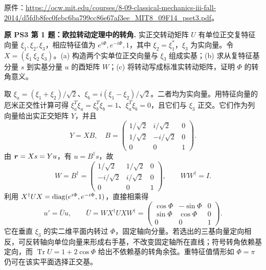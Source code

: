 原件：\url{https://ocw.mit.edu/courses/8-09-classical-mechanics-iii-fall-2014/d5fdb8fec0febc6ba799cc86e67af3ee_MIT8_09F14_pset3.pdf}。

\begin{example}
\textbf{原 PS3 第 1 题：欧拉转动定理中的转角.} 
实正交转动矩阵 $U$ 有单位正交复特征向量 $\xi_1,\xi_2,\xi_3$，相应特征值为 $e^{i\Phi},e^{-i\Phi},1$，其中 $\xi_2=\xi_1^*$，$\xi_3$ 为实向量。令 $X=(\xi_1\ \xi_2\ \xi_3)$。(a) 构造两个实单位正交向量与 $\xi_3$ 组成实基；(b) 求从复特征基分量 $s$ 到实基分量 $u$ 的酉矩阵 $W$；(c) 将转动写成标准实转动矩阵，证明 $\Phi$ 的转角意义。
\end{example}
\begin{solution}
取 $\xi_a=(\xi_1+\xi_2)/\sqrt2$、$\xi_b=i(\xi_1-\xi_2)/\sqrt2$。二者均为实向量。用特征向量的厄米正交性计算可得 $\xi_a^T\xi_a=\xi_b^T\xi_b=1$、$\xi_a^T\xi_b=0$，且它们与 $\xi_3$ 正交。它们作为列向量给出实正交矩阵 $Y$，并且
\[
 Y=XB,\quad B=\begin{pmatrix}1/\sqrt2&i/\sqrt2&0\\1/\sqrt2&-i/\sqrt2&0\\0&0&1\end{pmatrix}.
\]
由 $\boldsymbol{r}=Xs=Yu$，有 $u=B^\dagger s$，故
\[
 W=B^\dagger=\begin{pmatrix}1/\sqrt2&1/\sqrt2&0\\-i/\sqrt2&i/\sqrt2&0\\0&0&1\end{pmatrix},\qquad WW^\dagger=I.
\]
利用 $X^\dagger UX=\operatorname{diag}(e^{i\Phi},e^{-i\Phi},1)$，直接相乘得
\[
 u'=\bar Uu,\qquad
 \bar U=W X^\dagger UXW^\dagger
 =\begin{pmatrix}\cos\Phi&-\sin\Phi&0\\\sin\Phi&\cos\Phi&0\\0&0&1\end{pmatrix}.
\]
它在垂直 $\xi_3$ 的实二维平面内转过 $\Phi$，固定轴向分量。若选出的三基向量定向相反，可反转轴向单位向量来形成右手基，不改变固定轴所在直线；符号转角依赖基定向，而 $\operatorname{Tr}U=1+2\cos\Phi$ 给出不依赖基的转角余弦。重特征值情形如 $\Phi=\pi$ 仍可在该实平面选择正交基。
\end{solution}

